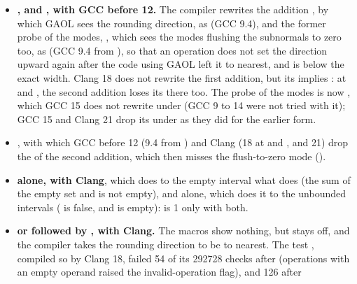\begin{itemize}
\item[$\bullet$] \textbf{, and
  , with GCC before 12.} The compiler
  rewrites the addition , by which GAOL sees the
  rounding direction, as  (GCC 9.4), and the former probe of
  the modes, , which sees the modes
  flushing the subnormals to zero too, as  (GCC 9.4 from
  ), so that an operation does not set the direction
  upward again after the code using GAOL left it to nearest, and
   is below the exact width. Clang 18 does not rewrite the first
  addition, but its  implies
  : at  and , the second
  addition loses its  there too. The probe of the modes is now
  , which GCC 15 does not rewrite
  under  (GCC 9 to 14 were not tried with
  it); GCC 15 and Clang 21 drop its
   under  as they did for the earlier
  form.
\item[$\bullet$] \textbf{}, with which GCC before 12
  (9.4 from ) and Clang (18 at  and , and
  21) drop the  of the second addition, which then misses the
  flush-to-zero mode ().\newinvfive
\item[$\bullet$] \textbf{ alone, with Clang}, which
  does to the empty interval what  does (the sum of
  the empty set and  is not empty), and
   alone, which does it to the unbounded
  intervals ( is false, and
   is empty):  is 1 only with
  both.\newinvfive
\item[$\bullet$] \textbf{ or  followed by
  , with Clang.} The macros show nothing, but
   stays off, and the compiler takes the rounding
  direction to be to nearest. The test ,
  compiled so by Clang 18, failed 54 of its 292728 checks after
   (operations with an empty operand raised
  the invalid-operation flag), and 126 after 

\end{itemize}
